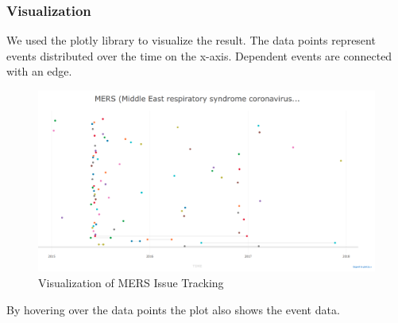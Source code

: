 \subsubsection{Visualization}
We used the plotly library to visualize the result. The data points represent events distributed over the time on the x-axis. Dependent events are connected with an edge.
\begin{figure}[h]
\centering
\includegraphics[scale= 0.2]{visualization.png}
\caption{Visualization of MERS Issue Tracking}
\end{figure}

By hovering over the data points the plot also shows the event data.